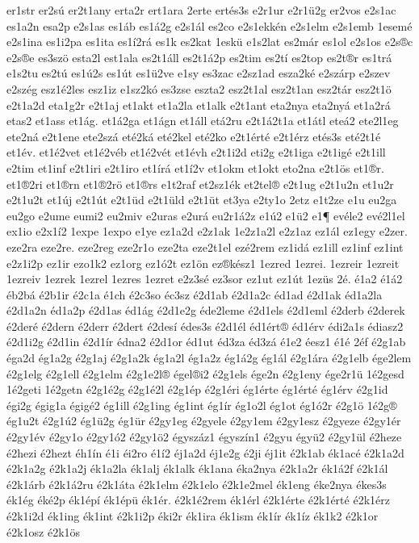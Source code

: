 {er1str
er2sú
er2t1any
erta2r
ert1ara
2erte
ertés3s
e2r1ur
e2r1ü2g
er2vos
e2s1ac
es1a2n
esa2p
e2s1as
es1áb
es1á2g
e2s1ál
es2co
e2s1ekkén
e2s1elm
e2s1emb
1esemé
e2s1ina
es1i2pa
es1ita
es1í2rá
es1k
es2kat
1eskü
e1s2lat
es2már
es1ol
e2s1os
e2s®c
e2s®e
es3szö
esta2l
est1ala
es2t1áll
es2t1á2p
es2tim
es2tí
es2top
es2t®r
es1trá
e1s2tu
es2tú
es1ú2s
es1út
es1ü2ve
e1sy
es3zac
e2sz1ad
esza2ké
e2szárp
e2szev
e2szég
esz1é2les
esz1iz
e1sz2kó
es3zse
eszta2
esz2t1al
esz2t1an
esz2tár
esz2t1ö
e2t1a2d
eta1g2r
e2t1aj
et1akt
et1a2la
et1alk
e2t1ant
eta2nya
eta2nyá
et1a2rá
etas2
et1ass
et1ág.
et1á2ga
et1ágn
et1áll
etá2ru
e2t1á2t1a
et1átl
eteá2
ete2l1eg
ete2ná
e2t1ene
ete2szá
eté2ká
eté2kel
eté2ko
e2t1érté
e2t1érz
etés3s
eté2t1é
et1év.
et1é2vet
et1é2véb
et1é2vét
et1évh
e2t1i2d
eti2g
e2t1iga
e2t1igé
e2t1ill
e2tim
et1inf
e2t1iri
e2t1iro
et1írá
et1í2v
et1okm
et1okt
eto2na
e2t1ös
et1®r.
et1®2ri
et1®rn
et1®2rö
et1®rs
e1t2raf
et2sz1ék
et2tel®
e2t1ug
e2t1u2n
et1u2r
e2t1u2t
et1új
e2t1út
e2t1üd
e2t1üld
e2t1üt
et3ya
e2ty1o
2etz
e1t2ze
e1u
eu2ga
eu2go
e2ume
eumi2
eu2miv
e2uras
e2urá
eu2r1á2z
e1ú2
e1ü2
e1¶
evéle2
evé2l1el
ex1io
e2x1í2
1expe
1expo
e1ye
ez1a2d
e2z1ak
1e2z1a2l
e2z1az
ez1ál
ez1egy
e2zer.
eze2ra
eze2re.
eze2reg
eze2r1o
eze2ta
eze2t1el
ezé2rem
ez1idá
ez1ill
ez1inf
ez1int
e2z1i2p
ez1ir
ezo1k2
ez1org
ez1ó2t
ez1ön
ez®kész1
1ezred
1ezrei.
1ezreir
1ezreit
1ezreiv
1ezrek
1ezrel
1ezres
1ezret
e2z3sé
ez3sor
ez1ut
ez1út
1ezüs
2é.
é1a2
é1á2
éb2bá
é2b1ir
é2c1a
é1ch
é2c3so
éc3sz
é2d1ab
é2d1a2c
éd1ad
é2d1ak
éd1a2la
é2d1a2n
éd1a2p
é2d1as
éd1ág
é2d1e2g
éde2leme
é2d1els
é2d1eml
é2derb
é2derek
é2deré
é2dern
é2derr
é2dert
é2desí
édes3s
é2d1él
éd1ért®
éd1érv
édi2a1s
édiasz2
é2d1i2g
é2d1in
é2d1ír
édna2
é2d1or
éd1ut
éd3za
éd3zá
é1e2
éesz1
é1é
2éf
é2g1ab
éga2d
ég1a2g
é2g1aj
é2g1a2k
ég1a2l
ég1a2z
ég1á2g
ég1ál
é2g1ára
é2g1elb
ége2lem
é2g1elg
é2g1ell
é2g1elm
é2g1e2l®
égel®i2
é2g1els
ége2n
é2g1eny
ége2r1ü
1é2gesd
1é2geti
1é2getn
é2g1é2g
é2g1é2l
é2g1ép
é2g1éri
ég1érte
ég1érté
ég1érv
é2g1id
égi2g
égig1a
égigé2
ég1ill
é2g1ing
ég1int
ég1ír
ég1o2l
ég1ot
ég1ó2r
é2g1ö
1é2g®
ég1u2t
é2g1ú2
ég1ü2g
ég1ür
é2gy1eg
é2gyele
é2gy1em
é2gy1esz
é2gyeze
é2gy1ér
é2gy1év
é2gy1o
é2gy1ó2
é2gy1ö2
égyszáz1
égyszín1
é2gyu
égyü2
é2gy1ül
é2heze
é2hezi
é2hezt
éh1ín
é1i
éi2ro
é1í2
éj1a2d
éj1e2g
é2ji
éj1it
é2k1ab
ék1acé
é2k1a2d
é2k1a2g
é2k1a2j
ék1a2la
ék1alj
ék1alk
ék1ana
éka2nya
é2k1a2r
ék1á2f
é2k1ál
é2k1árb
é2k1á2ru
é2k1áta
é2k1elm
é2k1elo
é2k1e2mel
ék1eng
éke2nya
ékes3s
ék1ég
éké2p
ék1épí
ék1épü
ék1ér.
é2k1é2rem
ék1érl
é2k1érte
é2k1érté
é2k1érz
é2k1i2d
ék1ing
ék1int
é2k1i2p
éki2r
ék1ira
ék1ism
ék1ír
ék1íz
ék1k2
é2k1or
é2k1osz
é2k1ös
}
